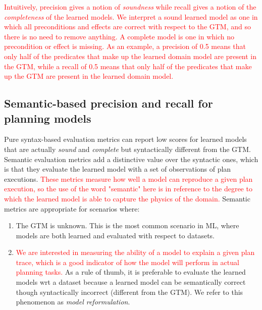 \textcolor{red}{Intuitively, precision gives a notion of {\em soundness} while recall gives a notion of the {\em completeness} of the learned models. We interpret a sound learned model as one in which all preconditions and effects are correct with respect to the GTM, and so there is no need to remove anything. A complete model is one in which no precondition or effect is missing.
As an example, a precision of 0.5 means that only half of the predicates that make up the learned domain model are present in the GTM, while a recall of 0.5 means that only half of the predicates that make up the GTM are present in the learned domain model.}

\subsection{Semantic-based precision and recall for planning models}
\label{semantic_precision_recall}

Pure syntax-based evaluation metrics can report low scores for learned models that are actually {\em sound} and {\em complete} but syntactically different from the GTM. Semantic evaluation metrics add a distinctive value over the syntactic ones, which is that they evaluate the learned model with a set of observations of plan executions. \textcolor{red}{These metrics measure how well a model can reproduce a given plan execution, so the use of the word "semantic" here is in reference to the degree to which the learned model is able to capture the physics of the domain.} Semantic metrics are appropriate for scenarios where:

\begin{enumerate}
	\item The GTM is unknown. This is the most common scenario in ML, where models are both learned and evaluated with respect to datasets.
	\item \textcolor{red}{We are interested in measuring the ability of a model to explain a given plan trace, which is a good indicator of how the model will perform in actual planning tasks.} As a rule of thumb, it is preferable to evaluate the learned models wrt a dataset because a learned model can be semantically correct though syntactically incorrect (different from the GTM). We refer to this phenomenon as \emph{model reformulation}.
\end{enumerate}


